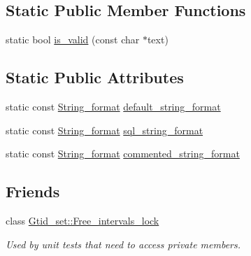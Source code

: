 \subsection*{Static Public Member Functions}
\begin{DoxyCompactItemize}
\item 
static bool \mbox{\hyperlink{classGtid__set_a8a10c1dfb57ac995cbf14b51f83f8e68}{is\+\_\+valid}} (const char $\ast$text)
\end{DoxyCompactItemize}
\subsection*{Static Public Attributes}
\begin{DoxyCompactItemize}
\item 
static const \mbox{\hyperlink{structGtid__set_1_1String__format}{String\+\_\+format}} \mbox{\hyperlink{classGtid__set_a65b9f6c31cfc7d5ca7b1564411c2a416}{default\+\_\+string\+\_\+format}}
\item 
static const \mbox{\hyperlink{structGtid__set_1_1String__format}{String\+\_\+format}} \mbox{\hyperlink{classGtid__set_abefb12fa60900cd38a8abe959b774f54}{sql\+\_\+string\+\_\+format}}
\item 
static const \mbox{\hyperlink{structGtid__set_1_1String__format}{String\+\_\+format}} \mbox{\hyperlink{classGtid__set_a4ba668b76ba3d4a4d96a91389dc31817}{commented\+\_\+string\+\_\+format}}
\end{DoxyCompactItemize}
\subsection*{Friends}
\begin{DoxyCompactItemize}
\item 
class \mbox{\hyperlink{classGtid__set_a59860055a243825524c47d9adc494250}{Gtid\+\_\+set\+::\+Free\+\_\+intervals\+\_\+lock}}
\begin{DoxyCompactList}\small\item\em Used by unit tests that need to access private members. \end{DoxyCompactList}\end{DoxyCompactItemize}


